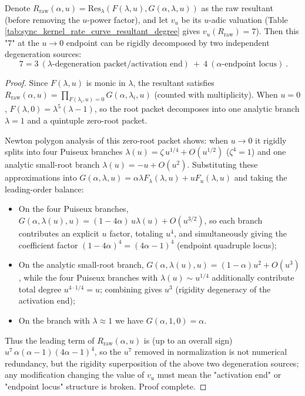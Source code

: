 


\begin{proposition}[\texorpdfstring{$v_u(R_{\mathrm{raw}})=7$}{vu=7} rigidity decomposition: \texorpdfstring{$7=3+4$}{7=3+4}]\label{prop:rate-resultant-uadic-split-7}
Denote \(R_{\mathrm{raw}}(\alpha,u)=\mathrm{Res}_\lambda(F(\lambda,u),G(\alpha,\lambda,u))\) as the raw resultant (before removing the \(u\)-power factor), and let \(v_u\) be its \(u\)-adic valuation (Table \ref{tab:sync_kernel_rate_curve_resultant_degree} gives \(v_u(R_{\mathrm{raw}})=7\)).
Then this "\(7\)" at the \(u\to 0\) endpoint can be rigidly decomposed by two independent degeneration sources:
\[
\boxed{\ 7=3\ (\lambda\text{-degeneration packet/activation end})\ +\ 4\ (\alpha\text{-endpoint locus})\ }.
\]
\begin{proof}
Since \(F(\lambda,u)\) is monic in \(\lambda\), the resultant satisfies
\(
R_{\mathrm{raw}}(\alpha,u)=\prod_{F(\lambda_i,u)=0}G(\alpha,\lambda_i,u)
\)
(counted with multiplicity).
When \(u=0\), \(F(\lambda,0)=\lambda^5(\lambda-1)\), so the root packet decomposes into one analytic branch \(\lambda=1\) and a quintuple zero-root packet.
\par
\noindent Newton polygon analysis of this zero-root packet shows: when \(u\to0\) it rigidly splits into four Puiseux branches
\(
\lambda(u)=\zeta\,u^{1/4}+O(u^{1/2})
\)
(\(\zeta^4=1\)) and one analytic small-root branch
\(
\lambda(u)=-u+O(u^2)
\).
Substituting these approximations into
\(
G(\alpha,\lambda,u)=\alpha\lambda F_\lambda(\lambda,u)+uF_u(\lambda,u)
\)
and taking the leading-order balance:
\begin{itemize}
  \item On the four Puiseux branches,
  \(
  G(\alpha,\lambda(u),u)=(1-4\alpha)\,u\lambda(u)+O(u^{3/2})
  \),
  so each branch contributes an explicit \(u\) factor, totaling \(u^4\), and simultaneously giving the coefficient factor \((1-4\alpha)^4=(4\alpha-1)^4\) (endpoint quadruple locus);
  \item On the analytic small-root branch,
  \(
  G(\alpha,\lambda(u),u)=(1-\alpha)u^2+O(u^3)
  \),
  while the four Puiseux branches with \(\lambda(u)\sim u^{1/4}\) additionally contribute total degree \(u^{4\cdot 1/4}=u\); combining gives \(u^3\) (rigidity degeneracy of the activation end);
  \item On the branch with \(\lambda\approx 1\) we have \(G(\alpha,1,0)=\alpha\).
\end{itemize}
Thus the leading term of \(R_{\mathrm{raw}}(\alpha,u)\) is (up to an overall sign)
\(
u^7\,\alpha(\alpha-1)(4\alpha-1)^4
\),
so the \(u^7\) removed in normalization is not numerical redundancy, but the rigidity superposition of the above two degeneration sources; any modification changing the value of \(v_u\) must mean the "activation end" or "endpoint locus" structure is broken. Proof complete.
\end{proof}
\end{proposition}


